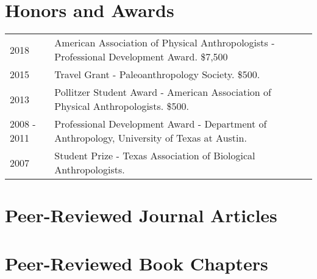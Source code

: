 \documentclass{article}
\begin{document}
\section*{Honors and Awards}

\begin{tabular}{p{}p{}}
2018 & American Association of Physical Anthropologists - Professional Development Award. \$7,500\\[4pt]
2015 & Travel Grant - Paleoanthropology Society. \$500.\\[4pt]
2013 & Pollitzer Student  Award - American Association of Physical Anthropologists. \$500.\\[4pt]
2008 - 2011 & Professional Development Award - Department of Anthropology, University of Texas at Austin.\\[4pt]
2007 & Student Prize - Texas Association of Biological Anthropologists.\\
\end{tabular}

\section*{Peer-Reviewed Journal Articles}

\begin{etaremune}

\end{etaremune}


\section*{Peer-Reviewed Book Chapters}
\begin{etaremune}

\end{etaremune}
\end{document}
